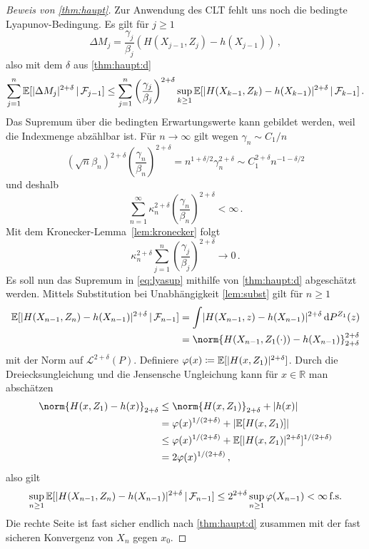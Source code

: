 \documentclass[ngerman,a4paper,11pt]{scrartcl}
\newcommand{\EE}{\mathbb{E}}
\newcommand{\RR}{\mathbb{R}}
\newcommand{\ff}{\mathcal{F}}
\renewcommand{\ll}{\mathcal{L}}
\newcommand{\interv}{\RR}
\newcommand{\expect}[1]{\EE[#1]}
\newcommand{\condexp}[2]{\EE[#1\,|\,#2]}
\newcommand{\dvar}[1]{\,\mathrm{d}#1}
\DeclarePairedDelimiter{\abs}{\lvert}{\rvert}		%
\begin{document}
\begin{proof}[Beweis von \cref{thm:haupt}]
Zur Anwendung des CLT fehlt uns noch die bedingte Lyapunov-Bedingung. Es gilt
für $j\geq 1$
\begin{equation*}
 \Delta M_j=\frac{\gamma_j}{\beta_j}(H(X_{j-1},Z_j)-h(X_{j-1}))\,,
\end{equation*}
also mit dem $\delta$ aus \cref{thm:haupt:d}
\begin{equation}\label{eq:lyasup}
 \sum_{j=1}^n\condexp{\abs{\Delta M_j}^{2+\delta}}{\ff_{j-1}}\leq\sum_{j=1}^n\left( \frac{\gamma_j}{\beta_j} \right)^{2+\delta}\sup_{k\geq 1}\condexp{\abs{H(X_{k-1}, Z_k)-h(X_{k-1})}^{2+\delta}}{\ff_{k-1}}\,.
\end{equation}
Das Supremum über die bedingten Erwartungswerte kann gebildet werden, weil die
Indexmenge abzählbar ist. Für $n\to\infty$ gilt wegen $\gamma_n\sim C_1/n$
\begin{equation*}
 (\sqrt{n}\beta_n)^{2+\delta} \left( \frac{\gamma_n}{\beta_n} \right)^{2+\delta}=n^{1+\delta/2}\gamma_n^{2+\delta}\sim C_1^{2+\delta}n^{-1-\delta/2}
\end{equation*}
und deshalb
\begin{equation*}
 \sum_{n=1}^\infty \kappa_n^{2+\delta}\left( \frac{\gamma_n}{\beta_n} \right)^{2+\delta}<\infty\,.
\end{equation*}
Mit dem Kronecker-Lemma~\ref{lem:kronecker} folgt
\begin{equation*}
 \kappa_n^{2+\delta} \sum_{j=1}^n\left( \frac{\gamma_j}{\beta_j} \right)^{2+\delta}\to 0\,.
\end{equation*}
Es soll nun das Supremum in \cref{eq:lyasup} mithilfe von \cref{thm:haupt:d} abgeschätzt werden.
Mittels Substitution bei Unabhängigkeit \ref{lem:subst} gilt für $n\geq 1$
\begin{align*}
  \condexp{\abs{H(X_{n-1},Z_n)-h(X_{n-1})}^{2+\delta}}{\ff_{n-1}}&=\int\abs{H(X_{n-1},z)-h(X_{n-1})}^{2+\delta}\dvar{P^{Z_1}(z)} \\
&=\norm{H(X_{n-1},Z_1(\cdot))-h(X_{n-1})}_{2+\delta}^{2+\delta}
\end{align*}
mit der Norm auf $\ll^{2+\delta}(P)$. Definiere
$\varphi(x)\coloneqq\expect{\abs{H(x,Z_1)}^{2+\delta}}$. Durch die
Dreiecksungleichung und die Jensensche Ungleichung kann für $x\in \interv$ man abschätzen
 \begin{align*}
   \norm{H(x,Z_1)-h(x)}_{2+\delta}&\leq\norm{H(x,Z_1)}_{2+\delta}+\abs{h(x)}\\
    &=\varphi(x)^{1/(2+\delta)}+\abs{\expect{H(x, Z_1)}}\\
&\leq\varphi(x)^{1/(2+\delta)}+\expect{\abs{H(x, Z_1)}^{2+\delta}}^{1/(2+\delta)}\\
&=2\varphi(x)^{1/(2+\delta)}\,,
 \end{align*}
 also gilt
 \begin{equation*}
  \sup_{n\geq 1} \condexp{\abs{H(X_{n-1},Z_n)-h(X_{n-1})}^{2+\delta}}{\ff_{n-1}}\leq 2^{2+\delta}\sup_{n\geq 1}\varphi(X_{n-1})<\infty\,\text{f.s.}
 \end{equation*}
 Die rechte Seite ist fast sicher endlich nach \cref{thm:haupt:d} zusammen mit der fast sicheren Konvergenz von $X_n$
 gegen $x_0$.
 

\end{proof}
\end{document}
